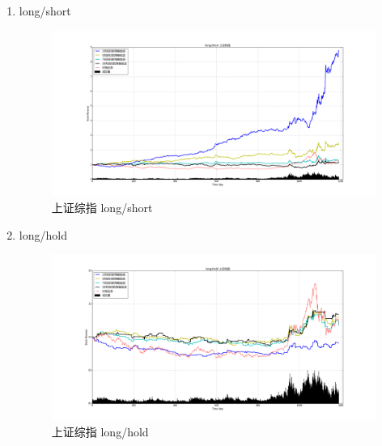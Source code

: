 \documentclass[12pt,a4paper]{article}
\begin{document}
\begin{enumerate}
\item long/short 
\begin{figure}[H]
	\centering
	\includegraphics[width=1.0\textwidth]{img_r_1/szzz.png}
	\caption{上证综指 long/short}
\end{figure}
\item long/hold 
\begin{figure}[H]
	\centering
	\includegraphics[width=1.0\textwidth]{img_r_1/szzz_1.png}
	\caption{上证综指 long/hold}
\end{figure}
\end{enumerate}
\end{document}
